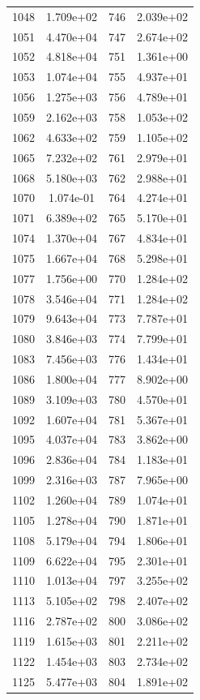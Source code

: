 \documentclass[12pt]{article}
\begin{document}
\begin{longtable}{@{}cccc@{}}
1048 & 1.709e+02 & 746 & 2.039e+02 \\
1051 & 4.470e+04 & 747 & 2.674e+02 \\
1052 & 4.818e+04 & 751 & 1.361e+00 \\
1053 & 1.074e+04 & 755 & 4.937e+01 \\
1056 & 1.275e+03 & 756 & 4.789e+01 \\
1059 & 2.162e+03 & 758 & 1.053e+02 \\
1062 & 4.633e+02 & 759 & 1.105e+02 \\
1065 & 7.232e+02 & 761 & 2.979e+01 \\
1068 & 5.180e+03 & 762 & 2.988e+01 \\
1070 & 1.074e-01 & 764 & 4.274e+01 \\
1071 & 6.389e+02 & 765 & 5.170e+01 \\
1074 & 1.370e+04 & 767 & 4.834e+01 \\
1075 & 1.667e+04 & 768 & 5.298e+01 \\
1077 & 1.756e+00 & 770 & 1.284e+02 \\
1078 & 3.546e+04 & 771 & 1.284e+02 \\
1079 & 9.643e+04 & 773 & 7.787e+01 \\
1080 & 3.846e+03 & 774 & 7.799e+01 \\
1083 & 7.456e+03 & 776 & 1.434e+01 \\
1086 & 1.800e+04 & 777 & 8.902e+00 \\
1089 & 3.109e+03 & 780 & 4.570e+01 \\
1092 & 1.607e+04 & 781 & 5.367e+01 \\
1095 & 4.037e+04 & 783 & 3.862e+00 \\
1096 & 2.836e+04 & 784 & 1.183e+01 \\
1099 & 2.316e+03 & 787 & 7.965e+00 \\
1102 & 1.260e+04 & 789 & 1.074e+01 \\
1105 & 1.278e+04 & 790 & 1.871e+01 \\
1108 & 5.179e+04 & 794 & 1.806e+01 \\
1109 & 6.622e+04 & 795 & 2.301e+01 \\
1110 & 1.013e+04 & 797 & 3.255e+02 \\
1113 & 5.105e+02 & 798 & 2.407e+02 \\
1116 & 2.787e+02 & 800 & 3.086e+02 \\
1119 & 1.615e+03 & 801 & 2.211e+02 \\
1122 & 1.454e+03 & 803 & 2.734e+02 \\
1125 & 5.477e+03 & 804 & 1.891e+02 \\

\end{longtable}
\end{document}
